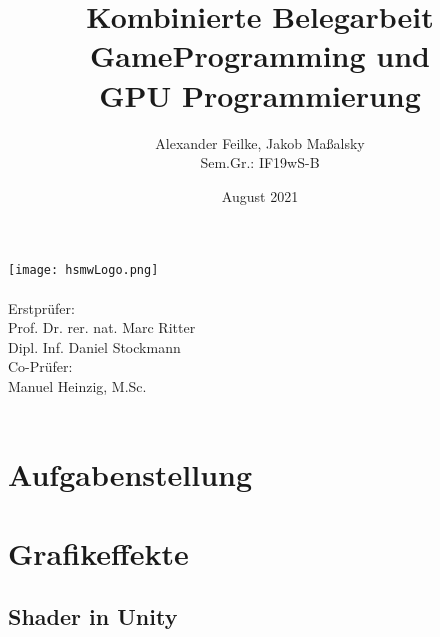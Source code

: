 \documentclass[a4paper,ngerman,12pt]{report}
\title{Kombinierte Belegarbeit \\ GameProgramming und \\ GPU Programmierung}
\author{Alexander Feilke, Jakob Ma{\ss}alsky \\ Sem.Gr.: IF19wS-B}
\date{August 2021}
\begin{document}

\normalfont

\makeatletter
\begin{titlepage}
\begin{center}
    \texttt{[image: hsmwLogo.png]}\\[10ex]
    {\huge \@title}\\[10ex]
    {\Large Erstprüfer: \\
        Prof. Dr. rer. nat. Marc Ritter \\
        Dipl. Inf. Daniel Stockmann \\ \vspace{1em}
        Co-Prüfer: \\ Manuel Heinzig, M.Sc.
    }\\[20ex]
    {\Large \@author}\\[10ex]
    {\large \@date}
\end{center}
\end{titlepage}
\makeatother


\renewcommand{\contentsname}{Inhaltsverzeichnis}
\tableofcontents
\newpage


\sloppy
\flushbottom



\chapter{Aufgabenstellung}

\lipsum[3]








\chapter{Grafikeffekte}




\section{Shader in Unity}

\lipsum[3]
\end{document}

